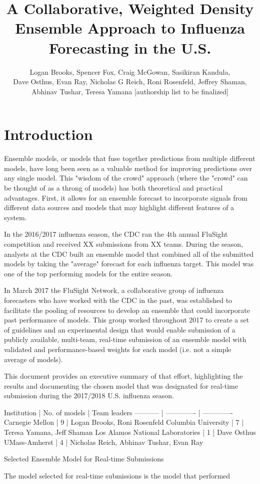 \documentclass{article}
\title{A Collaborative, Weighted Density Ensemble Approach to Influenza Forecasting in the U.S.}
\author{Logan Brooks, Spencer Fox, Craig McGowan, Sasikiran Kandula, \\ Dave Osthus, Evan Ray, Nicholas G Reich, Roni Rosenfeld, Jeffrey Shaman, \\Abhinav Tushar, Teresa Yamana [authorship list to be finalized]}
\begin{document}


\maketitle

\tableofcontents



\section{Introduction}

Ensemble models, or models that fuse together predictions from multiple different models, have long been seen as a valuable method for improving predictions over any single model. This "wisdom of the crowd" approach (where the "crowd" can be thought of as a throng of models) has both theoretical and practical advantages. First, it allows for an ensemble forecast to incorporate signals from different data sources and models that may highlight different features of a system. 

In the 2016/2017 influenza season, the CDC ran the 4th annual FluSight competition and received XX submissions from XX teams. During the season, analysts at the CDC built an ensemble model that combined all of the submitted models by taking the "average" forecast for each influenza target. This model was one of the top performing models for the entire season.

In March 2017 the FluSight Network, a collaborative group of influenza forecasters who have worked with the CDC in the past, was established to facilitate the pooling of resources to develop an ensemble that could incorporate past performance of models. This group worked throughout 2017 to create a set of guidelines and an experimental design that would enable submission of a publicly available, multi-team, real-time submission of an ensemble model with validated and performance-based weights for each model (i.e. not a simple average of models). 

This document provides an executive summary of that effort, highlighting the results and documenting the chosen model that was designated for real-time submission during the 2017/2018 U.S. influenza season.

Institution | No. of models | Team leaders
----------- | ------------- | -------------
Carnegie Mellon | 9 | Logan Brooks, Roni Rosenfeld
Columbia University | 7 | Teresa Yamana, Jeff Shaman
Los Alamos National Laboratories | 1 | Dave Osthus
UMass-Amherst | 4 | Nicholas Reich, Abhinav Tushar, Evan Ray


 Selected Ensemble Model for Real-time Submissions

The model selected for real-time submissions is the model that performed 
\end{document}
